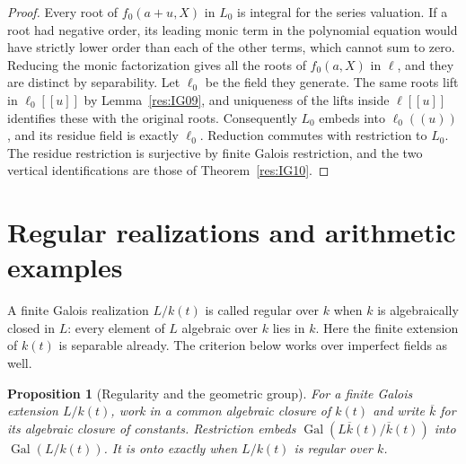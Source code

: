 \documentclass[11pt,oneside,openany]{book}
\newtheorem{proposition}[theorem]{Proposition}
\theoremstyle{definition}
\theoremstyle{remark}
\begin{document}
\begin{proof}
Every root of \(f_0(a+u,X)\) in \(L_0\) is integral for the
series valuation. If a root had negative order, its leading monic
term in the polynomial equation would have strictly lower order
than each of the other terms, which cannot sum to zero.
Reducing the monic factorization gives all the roots of \(f_0(a,X)\)
in \(\ell\), and they are distinct by separability. Let \(\ell_0\)
be the field they generate. The same roots lift in
\(\ell_0[[u]]\) by Lemma~\ref{res:IG09}, and uniqueness of the
lifts inside \(\ell[[u]]\) identifies these with the original
roots. Consequently \(L_0\) embeds into \(\ell_0((u))\), and its
residue field is exactly \(\ell_0\). Reduction commutes with
restriction to \(L_0\). The residue restriction is surjective
by finite Galois restriction, and the two vertical identifications
are those of Theorem~\ref{res:IG10}.
\end{proof}

\section{Regular realizations and arithmetic examples}

A finite Galois realization \(L/k(t)\) is called regular over
\(k\) when \(k\) is algebraically closed in \(L\): every element
of \(L\) algebraic over \(k\) lies in \(k\).
Here the finite extension of \(k(t)\) is separable already.
The criterion below works over imperfect fields as well.

\begin{proposition}[Regularity and the geometric group]
\label{res:IG12}
For a finite Galois extension \(L/k(t)\), work in a common algebraic
closure of \(k(t)\) and write \(\overline k\) for its algebraic
closure of constants. Restriction embeds
\(\operatorname{Gal}(L\overline k(t)/\overline k(t))\) into
\(\operatorname{Gal}(L/k(t))\). It is onto exactly when \(L/k(t)\)
is regular over \(k\).
\end{proposition}
\end{document}
